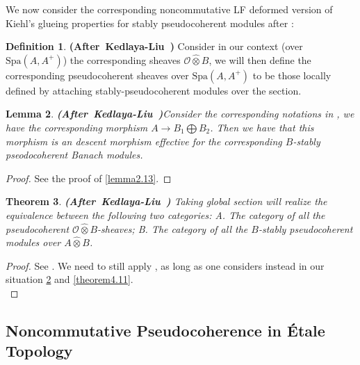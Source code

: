 \documentclass[12pt]{amsart}
\newtheorem{theorem}{Theorem}[section]
\newtheorem{lemma}[theorem]{Lemma}
\theoremstyle{definition}
\newtheorem{definition}[theorem]{Definition}
\numberwithin{equation}{section}
\begin{document}
\indent We now consider the corresponding noncommutative LF deformed version of Kiehl's glueing properties for stably pseudocoherent modules after \cite{KL2}:



\begin{definition} \mbox{\bf{(After Kedlaya-Liu \cite[Definition 2.5.3]{KL2})}}
Consider in our context (over $\mathrm{Spa}(A,A^+)$) the corresponding sheaves $\mathcal{O}\widehat{\otimes}B$, we will then define the corresponding pseudocoherent sheaves over $\mathrm{Spa}(A,A^+)$ to be those locally defined by attaching stably-pseudocoherent modules over the section. 
\end{definition}



\begin{lemma} \mbox{\bf{(After Kedlaya-Liu \cite[Lemma 2.5.4]{KL2})}}\label{lemma4.13}
	Consider the corresponding notations in \cite[Lemma 2.4.10]{KL2}, we have the corresponding morphism $A\rightarrow B_1\bigoplus B_2$. Then we have that this morphism is an descent morphism effective for the corresponding $B$-stably pseodocoherent Banach modules. 
\end{lemma}


\begin{proof}
See the proof of \cref{lemma2.13}.
\end{proof}




\begin{theorem}\mbox{\bf{(After Kedlaya-Liu \cite[Theorem 2.5.5]{KL2})}} \label{theorem4.14}
Taking global section will realize the equivalence between the following two categories: A. The category of all the pseudocoherent $\mathcal{O}\widehat{\otimes}B$-sheaves; B. The category of all the $B$-stably pseudocoherent modules over $A\widehat{\otimes}B$. 	
\end{theorem}


\begin{proof}
See \cite[Theorem 2.5.5]{KL2}. We need to still apply \cite[Proposition 2.4.20]{KL1}, as long as one considers instead in our situation \cref{lemma4.13} and \cref{theorem4.11}.\\	
\end{proof}






\subsection{Noncommutative Pseudocoherence in \'Etale Topology}
\end{document}
